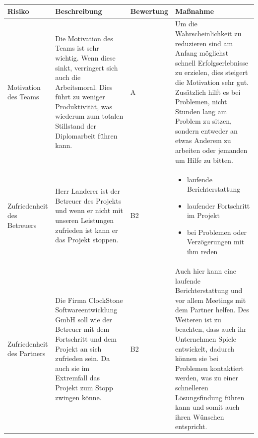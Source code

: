 	\begin{table}[H]
			\centering
		\renewcommand{\arraystretch}{1.5}
		\begin{tabular}{|p{3cm}|p{5cm}|p{2cm}|p{5cm}|}
			\hline
			\textbf{Risiko} & \textbf{Beschreibung} & \textbf{Bewertung} & \textbf{Maßnahme} \\
			\hline
			Motivation des Teams & Die Motivation des Teams ist sehr wichtig. Wenn diese sinkt, verringert sich auch die Arbeitsmoral. Dies führt zu weniger Produktivität, was wiederum zum totalen Stillstand der Diplomarbeit führen kann. & A & Um die Wahrscheinlichkeit zu reduzieren sind am Anfang möglichst schnell Erfolgserlebnisse zu erzielen, dies steigert die Motivation sehr gut. Zusätzlich hilft es bei Problemen, nicht Stunden lang am Problem zu sitzen, sondern entweder an etwas Anderem zu arbeiten oder jemanden um Hilfe zu bitten.\\
			\hline
			Zufriedenheit des Betreuers & Herr Landerer ist der Betreuer des Projekts und wenn er nicht mit unseren Leistungen zufrieden ist kann er das Projekt stoppen. & B2 & \begin{itemize}
				\item laufende Berichterstattung
				\item laufender Fortschritt im Projekt
				\item bei Problemen oder Verzögerungen mit ihm reden
			\end{itemize}\\
		\hline
		Zufriedenheit des Partners & Die Firma ClockStone Softwareentwicklung GmbH soll wie der Betreuer mit dem Fortschritt und dem Projekt an sich zufrieden sein. Da auch sie im Extremfall das Projekt zum Stopp zwingen könne. & B2 & Auch hier kann eine laufende Berichterstattung und vor allem Meetings mit dem Partner helfen. Des Weiteren ist zu beachten, dass auch ihr Unternehmen Spiele entwickelt, dadurch können sie bei Problemen kontaktiert werden, was zu einer schnelleren Lösungsfindung führen kann und somit auch ihren Wünschen entspricht.\\
		 \hline
		\end{tabular}
	\end{table}
\newpage
